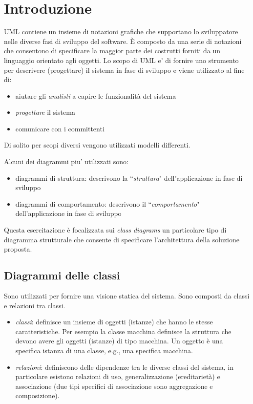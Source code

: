 \documentclass{article}
\begin{document}
\section{Introduzione}
UML contiene un insieme di notazioni grafiche che supportano lo sviluppatore nelle diverse fasi di sviluppo del software. \`E composto da una serie di notazioni che consentono di specificare la maggior parte dei costrutti  forniti da un linguaggio orientato agli oggetti. Lo scopo di UML e' di fornire uno strumento  per descrivere (progettare) il sistema in fase di sviluppo e viene utilizzato al fine di:
\begin{itemize}
\item aiutare gli \emph{analisti} a capire le funzionalit\`a del sistema
\item \emph{progettare} il sistema
\item comunicare con i committenti
\end{itemize}
Di solito per scopi diversi vengono utilizzati modelli differenti.

Alcuni dei diagrammi piu' utilizzati sono:
\begin{itemize}
\item diagrammi di struttura: descrivono la ``\emph{struttura}" dell'applicazione in fase di sviluppo
\item diagrammi di comportamento: descrivono il ``\emph{comportamento}" dell'applicazione in fase di sviluppo
\end{itemize}

Questa esercitazione \`e focalizzata sui \emph{class diagrams} un particolare tipo di diagramma strutturale che consente di specificare l'architettura della soluzione proposta.

\subsection{Diagrammi delle classi}
Sono utilizzati per fornire una visione statica del sistema. Sono composti da classi e relazioni tra classi.
\begin{itemize}
\item \emph{classi}: definisce un insieme di oggetti (istanze) che hanno le stesse caratteristiche. Per esempio la classe macchina definisce la struttura che devono avere gli oggetti (istanze) di tipo macchina. Un oggetto \`e una specifica istanza di una classe, e.g., una specifica macchina.
\item \emph{relazioni}: definiscono delle dipendenze tra le diverse classi del sistema, in particolare esistono relazioni di uso, generalizzazione (ereditariet\`a) e associazione (due tipi specifici di associazione sono aggregazione e composizione).
\end{itemize}
\end{document}
